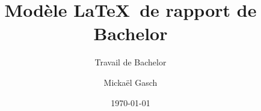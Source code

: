 \author{Mickaël Gasch}


\title{Modèle \LaTeX~de rapport de Bachelor}

\subtitle{Travail de Bachelor}


\date{\today}


